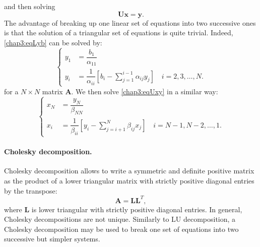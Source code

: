 and then solving 
\begin{equation}
\label{chap3:eqUxy}
\mathbf{U} \mathbf{x} = \mathbf{y}.
\end{equation}
The advantage of breaking up one linear set of equations into two successive ones is that the solution of a triangular set of equations is quite trivial. Indeed, \eqref{chap3:eqLyb} can be solved by:
\begin{equation} 
\left\lbrace
	\begin{aligned}
		y_1 &= \dfrac{b_1}{\alpha_{11}}  \\	
		y_i &= \dfrac{1}{\alpha_{ii}} \left[ b_i - \sum_{j=1}^{i-1} \alpha_{ij} y_j \right] \quad i = 2, 3, \ldots, N.
	\end{aligned} 
\right.
\end{equation}
for a $ N \times N $ matrix $ \mathbf{A} $. We then solve \eqref{chap3:eqUxy} in a similar way:
\begin{equation} 
\left\lbrace
	\begin{aligned}
		x_N &= \dfrac{y_N}{\beta_{NN}} \\	
		x_i &= \dfrac{1}{\beta_{ii}} \left[ y_i - \sum_{j=i+1}^{N} \beta_{ij} x_j \right] \quad i = N-1, N-2, \ldots, 1. 
	\end{aligned} 
\right.
\end{equation}


\paragraph*{Cholesky decomposition.}	\label{chap3:CholeskyDecompo}
Cholesky decomposition allows to write a symmetric and definite positive matrix as the product of a lower triangular matrix with strictly positive diagonal entries by the transpose: 
\begin{equation}
\label{chap3:Cholesky}
\mathbf{A} = \mathbf{L} \mathbf{L}^T,
\end{equation}
where $ \mathbf{L} $ is lower triangular with strictly positive diagonal entries. In general, Cholesky decompositions are not unique. Similarly to LU decomposition, a Cholesky decomposition may be used to break one set of equations into two successive but simpler systems. 


